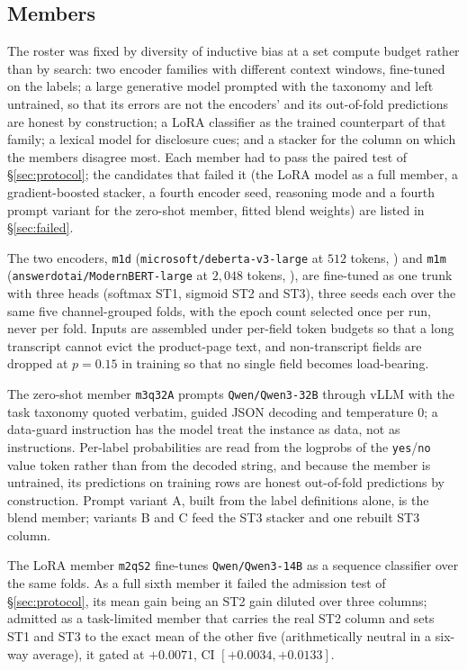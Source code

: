 \documentclass[11pt]{article}
\newcommand{\lab}[1]{\texttt{\small #1}}
\begin{document}
\subsection{Members}
\label{sec:members}

The roster was fixed by diversity of inductive bias at a set compute budget rather than by
search: two encoder families with different context windows, fine-tuned on the labels; a large
generative model prompted with the taxonomy and left untrained, so that its errors are not the
encoders' and its out-of-fold predictions are honest by construction; a LoRA classifier as the
trained counterpart of that family; a lexical model for disclosure cues; and a stacker for the
column on which the members disagree most. Each member had to pass the paired test of
\S\ref{sec:protocol}; the candidates that failed it (the LoRA model as a full member, a
gradient-boosted stacker, a fourth encoder seed, reasoning mode and a fourth prompt variant for
the zero-shot member, fitted blend weights) are listed in \S\ref{sec:failed}.

The two encoders, \lab{m1d} (\lab{microsoft/deberta-v3-large} at $512$ tokens,
\citealp{he2021deberta}) and \lab{m1m} (\lab{answerdotai/ModernBERT-large} at $2{,}048$ tokens,
\citealp{warner2024modernbert}), are fine-tuned as one trunk with three heads (softmax ST1,
sigmoid ST2 and ST3), three seeds each over the same five channel-grouped folds, with the epoch
count selected once per run, never per fold. Inputs are assembled under per-field token budgets
so that a long transcript cannot evict the product-page text, and non-transcript fields are
dropped at $p{=}0.15$ in training so that no single field becomes load-bearing.

The zero-shot member \lab{m3q32A} prompts \lab{Qwen/Qwen3-32B} \cite{qwen3} through vLLM
\cite{kwon2023vllm} with the task taxonomy quoted verbatim, guided JSON decoding and temperature
$0$; a data-guard instruction has the model treat the instance as data, not as instructions.
Per-label probabilities are read from the logprobs of the \lab{yes}/\lab{no} value token rather
than from the decoded string, and because the member is untrained, its predictions on training
rows are honest out-of-fold predictions by construction. Prompt variant A, built from the label
definitions alone, is the blend member; variants B and C feed the ST3 stacker and one rebuilt
ST3 column.

The LoRA member \lab{m2qS2} fine-tunes \lab{Qwen/Qwen3-14B} as a sequence classifier
\cite{hu2022lora} over the same folds. As a full sixth member it failed the admission test of
\S\ref{sec:protocol}, its mean gain being an ST2 gain diluted over three columns; admitted as a
task-limited member that carries the real ST2 column and sets ST1 and ST3 to the exact mean of
the other five (arithmetically neutral in a six-way average), it gated at $+0.0071$, CI
$[+0.0034,+0.0133]$.
\end{document}
